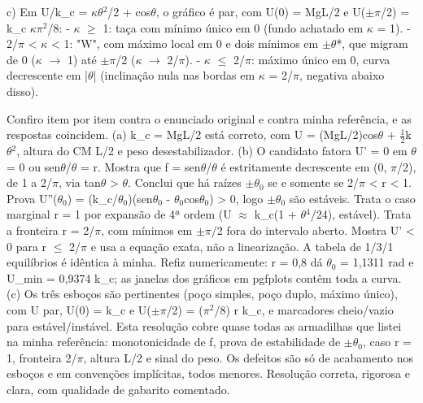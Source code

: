 \documentclass{article}%
\begin{document}
c) Em U/k\_c = $\kappa$$\theta$$^2$/2 + cos$\theta$, o gráfico é par, com U(0) = MgL/2 e U($\pm$$\pi$/2) = k\_c $\kappa$$\pi$$^2$/8:\newline%
{-} $\kappa$ $\geq$ 1: taça com mínimo único em 0 (fundo achatado em $\kappa$ = 1).\newline%
{-} 2/$\pi$ < $\kappa$ < 1: "W", com máximo local em 0 e dois mínimos em $\pm$$\theta$*, que migram de 0 ($\kappa$ $\to$ 1) até $\pm$$\pi$/2 ($\kappa$ $\to$ 2/$\pi$).\newline%
{-} $\kappa$ $\leq$ 2/$\pi$: máximo único em 0, curva decrescente em |$\theta$| (inclinação nula nas bordas em $\kappa$ = 2/$\pi$, negativa abaixo disso).\par %
Confiro item por item contra o enunciado original e contra minha referência, e as respostas coincidem. (a) k\_c = MgL/2 está correto, com U = (MgL/2)cos$\theta$ + $\frac12$k$\theta$$^2$, altura do CM L/2 e peso desestabilizador. (b) O candidato fatora U' = 0 em $\theta$ = 0 ou sen$\theta$/$\theta$ = r. Mostra que f = sen$\theta$/$\theta$ é estritamente decrescente em (0, $\pi$/2), de 1 a 2/$\pi$, via tan$\theta$ > $\theta$. Conclui que há raízes $\pm$$\theta$$_{0}$ se e somente se 2/$\pi$ < r < 1. Prova U''($\theta$$_{0}$) = (k\_c/$\theta$$_{0}$)(sen$\theta$$_{0}$ - $\theta$$_{0}$cos$\theta$$_{0}$) > 0, logo $\pm$$\theta$$_{0}$ são estáveis. Trata o caso marginal r = 1 por expansão de 4ª ordem (U $\approx$ k\_c(1 + $\theta$$^{4}$/24), estável). Trata a fronteira r = 2/$\pi$, com mínimos em $\pm$$\pi$/2 fora do intervalo aberto. Mostra U' < 0 para r $\leq$ 2/$\pi$ e usa a equação exata, não a linearização. A tabela de 1/3/1 equilíbrios é idêntica à minha. Refiz numericamente: r = 0,8 dá $\theta$$_{0}$ = 1,1311 rad e U\_min = 0,9374 k\_c; as janelas dos gráficos em pgfplots contêm toda a curva. (c) Os três esboços são pertinentes (poço simples, poço duplo, máximo único), com U par, U(0) = k\_c e U($\pm$$\pi$/2) = ($\pi$$^2$/8) r k\_c, e marcadores cheio/vazio para estável/instável. Esta resolução cobre quase todas as armadilhas que listei na minha referência: monotonicidade de f, prova de estabilidade de $\pm$$\theta$$_{0}$, caso r = 1, fronteira 2/$\pi$, altura L/2 e sinal do peso. Os defeitos são só de acabamento nos esboços e em convenções implícitas, todos menores. Resolução correta, rigorosa e clara, com qualidade de gabarito comentado.%
\end{document}
